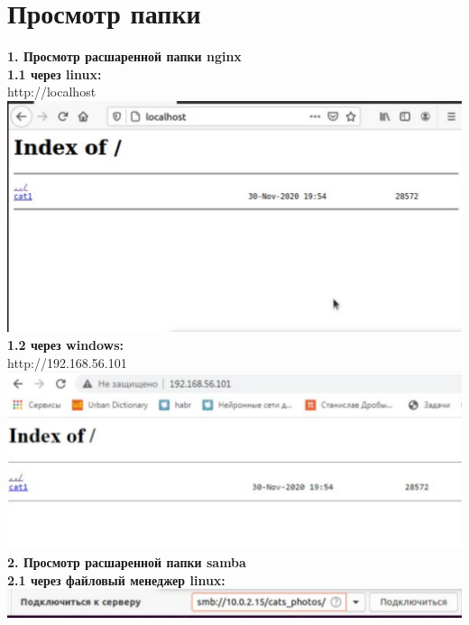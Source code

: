 \documentclass[12pt,a4paper]{scrartcl}
\begin{document}
\section{Просмотр папки}
\textnumero \textbf{1. Просмотр расшаренной папки nginx}\\
\textnumero \textbf{1.1 через linux:} \\[5pt]
http://localhost \\[5pt]
\includegraphics[scale=10, width=15cm]{f5} \\[5pt]
\textnumero \textbf{1.2 через windows:} \\[5pt] 
http://192.168.56.101 \\[5pt]
\includegraphics[scale=10, width=15cm]{f6} \\[5pt]
\textnumero \textbf{2. Просмотр расшаренной папки samba} \\[5pt]
\textnumero \textbf{2.1 через файловый менеджер linux:} \\[5pt]
\includegraphics[scale=10, width=15cm]{f7} \\[5pt]
\end{document}
